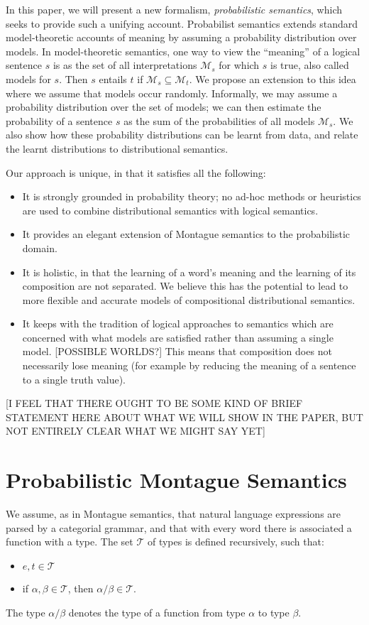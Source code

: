 \documentclass[letterpaper]{article}
\begin{document}
In this paper, we
will present a new formalism, {\em probabilistic semantics\/}, which seeks to provide such a unifying account. Probabilist semantics extends standard model-theoretic accounts of meaning by assuming a probability distribution over models.  In
model-theoretic semantics, one way to view the ``meaning'' of a
logical sentence $s$ is as the set of all interpretations
$\mathcal{M}_s$ for which $s$ is true, also called models for
$s$. Then $s$ entails $t$ if $\mathcal{M}_s \subseteq
\mathcal{M}_t$. We propose an extension to this idea where we assume
that models occur randomly. Informally, we may assume a probability
distribution over the set of models; we can then estimate the
probability of a sentence $s$ as the sum of the probabilities of all
models $\mathcal{M}_s$. We also show how these probability
distributions can be learnt from data, and relate the learnt
distributions to distributional semantics.

Our approach is unique, in that it satisfies all the following:
\begin{itemize}
\item It is strongly grounded in probability theory; no ad-hoc methods
  or heuristics are used to combine distributional semantics with
  logical semantics.
\item It provides an elegant extension of Montague semantics to the
  probabilistic domain.
\item It is holistic, in that the learning of a word's meaning and the
  learning of its composition are not separated. We believe this has
  the potential to lead to more flexible and accurate models of
  compositional distributional semantics.
\item It keeps with the tradition of logical approaches to semantics
  which are concerned with what models are satisfied rather than
  assuming a single model. [POSSIBLE WORLDS?] This means that composition does not
  necessarily lose meaning (for example by reducing the meaning of a
  sentence to a single truth value).
\end{itemize}

[I FEEL THAT THERE OUGHT TO BE SOME KIND OF BRIEF STATEMENT HERE ABOUT WHAT WE WILL SHOW IN THE PAPER, BUT NOT ENTIRELY CLEAR WHAT WE MIGHT SAY YET]

\section{Probabilistic Montague Semantics}

We assume, as in Montague semantics, that natural language expressions
are parsed by a categorial grammar, and that with every word there is
associated a function with a type. The set $\mathcal{T}$ of types is defined
recursively, such that:
\begin{itemize}
\item $e,t\in \mathcal{T}$
\item if $\alpha, \beta\in \mathcal{T}$, then $\alpha/\beta\in \mathcal{T}$.
\end{itemize}
The type $\alpha/\beta$ denotes the type of a function from type
$\alpha$ to type $\beta$.
\end{document}
